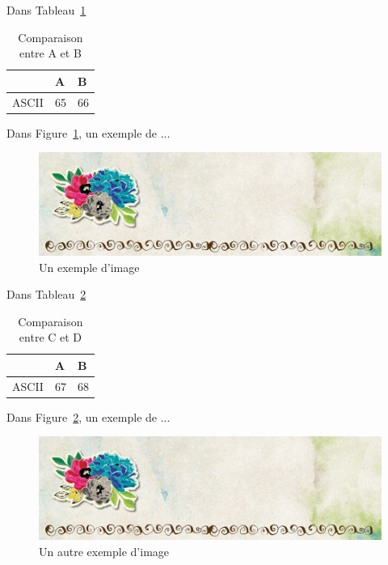 \documentclass{book}
\begin{document}
	\listoffigures
	\listoftables
	
	\clearpage
	
	Dans Tableau~\ref{tab-comp}
	\begin{table}[!ht]
		\caption{Comparaison entre A et B}
		\label{tab-comp}
		\centering
		\begin{tabular}{lll}
			\hline \hline 
			& A & B \\
			\hline 
			ASCII & 65 & 66 \\
			\hline \hline 
		\end{tabular}
	\end{table}

	\clearpage
	
	Dans Figure~\ref{fig-exemp}, un exemple de ...
	\begin{figure}[!ht]
		\caption{Un exemple d'image}
		\label{fig-exemp}
		\includegraphics{banner.jpg}
	\end{figure}

	\clearpage
	
	Dans Tableau~\ref{tab-comp2}
	\begin{table}[!ht]
		\caption{Comparaison entre C et D}
		\label{tab-comp2}
		\centering
		\begin{tabular}{lll}
			\hline \hline 
			& A & B \\
			\hline 
			ASCII & 67 & 68 \\
			\hline \hline 
		\end{tabular}
	\end{table}

	Dans Figure~\ref{fig-exemp2}, un exemple de ...
	\begin{figure}[!ht]
		\caption{Un autre exemple d'image}
		\label{fig-exemp2}
		\includegraphics{banner.jpg}
	\end{figure}

	
\end{document}
